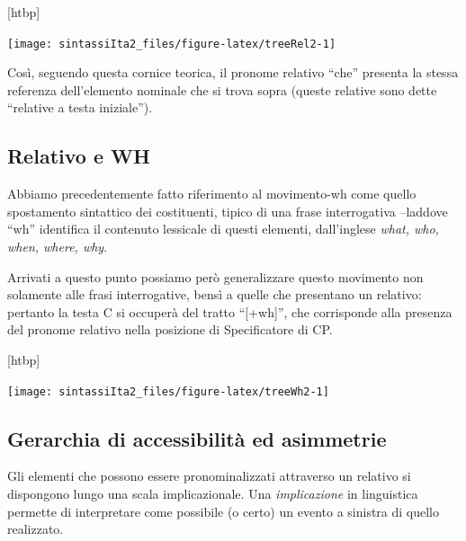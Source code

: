 \documentclass[
  a4paper,
  twoside,
  11pt,
  chapterprefix=false,
  bibliography=totocnumbered,
  listof=flat]{scrbook}
\makeatletter
\def\fps@figure{htbp}
\renewenvironment{figure}[1][\fps@figure]{
  \edef\@tempa{\noexpand\@float{figure}[#1]} 
  \@tempa
  \sffamily
}{
  \end@float
}
\makeatother
\begin{document}
\begin{figure}

{\centering \texttt{[image: sintassiIta2\_files/figure-latex/treeRel2-1]} 

}

\caption{Esempio di costruzione relativa (oggetto)}\label{fig:treeRel2}
\end{figure}

Così, seguendo questa cornice teorica, il pronome relativo \enquote{che} presenta la stessa referenza dell'elemento nominale che si trova sopra (queste relative sono dette \enquote{relative a testa iniziale}).

\hypertarget{relativo-e-wh}{%
\subsection{Relativo e WH}\label{relativo-e-wh}}

Abbiamo precedentemente fatto riferimento al movimento-wh come quello spostamento sintattico dei costituenti, tipico di una frase interrogativa --laddove \enquote{wh} identifica il contenuto lessicale di questi elementi, dall'inglese \emph{what, who, when, where, why}.

Arrivati a questo punto possiamo però generalizzare questo movimento non solamente alle frasi interrogative, bensì a quelle che presentano un relativo: pertanto la testa C si occuperà del tratto \enquote{{[}+wh{]}}, che corrisponde alla presenza del pronome relativo nella posizione di Specificatore di CP.

\begin{figure}

{\centering \texttt{[image: sintassiIta2\_files/figure-latex/treeWh2-1]} 

}

\caption{La testa C e il tratto [wh]}\label{fig:treeWh2}
\end{figure}

\hypertarget{gerarchia-di-accessibilita-ed-asimmetrie}{%
\subsection{Gerarchia di accessibilità ed asimmetrie}\label{gerarchia-di-accessibilita-ed-asimmetrie}}

Gli elementi che possono essere pronominalizzati attraverso un relativo si dispongono lungo una scala implicazionale. Una \emph{implicazione} in linguistica permette di interpretare come possibile (o certo) un evento a sinistra di quello realizzato.
\end{document}
